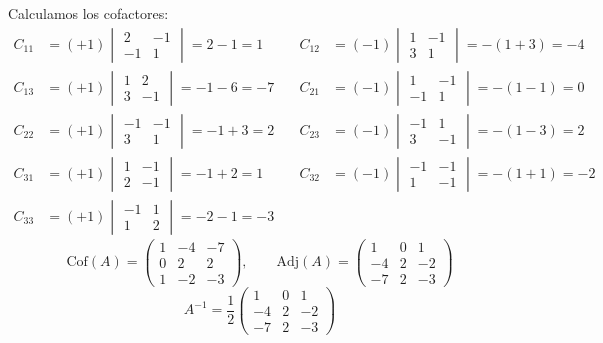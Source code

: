 \documentclass[12pt]{article}
\begin{document}
Calculamos los cofactores:
\[
\begin{aligned}
C_{11} &= (+1)\begin{vmatrix}2&-1\\-1&1\end{vmatrix} = 2-1 = 1 &\quad
C_{12} &= (-1)\begin{vmatrix}1&-1\\3&1\end{vmatrix} = -(1+3) = -4\\[4pt]
C_{13} &= (+1)\begin{vmatrix}1&2\\3&-1\end{vmatrix} = -1-6 = -7 &\quad
C_{21} &= (-1)\begin{vmatrix}1&-1\\-1&1\end{vmatrix} = -(1-1) = 0\\[4pt]
C_{22} &= (+1)\begin{vmatrix}-1&-1\\3&1\end{vmatrix} = -1+3 = 2 &\quad
C_{23} &= (-1)\begin{vmatrix}-1&1\\3&-1\end{vmatrix} = -(1-3) = 2\\[4pt]
C_{31} &= (+1)\begin{vmatrix}1&-1\\2&-1\end{vmatrix} = -1+2 = 1 &\quad
C_{32} &= (-1)\begin{vmatrix}-1&-1\\1&-1\end{vmatrix} = -(1+1) = -2\\[4pt]
C_{33} &= (+1)\begin{vmatrix}-1&1\\1&2\end{vmatrix} = -2-1 = -3 &
\end{aligned}
\]
\[
\text{Cof}(A) = \begin{pmatrix}1&-4&-7\\0&2&2\\1&-2&-3\end{pmatrix}, \qquad
\text{Adj}(A) = \begin{pmatrix}1&0&1\\-4&2&-2\\-7&2&-3\end{pmatrix}
\]
\[
A^{-1} = \frac{1}{2}\begin{pmatrix}1&0&1\\-4&2&-2\\-7&2&-3\end{pmatrix}
\]
\end{document}
